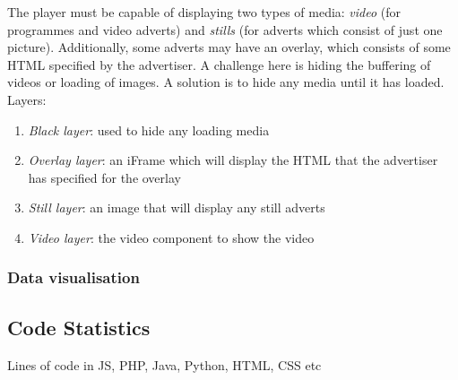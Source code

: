 The player must be capable of displaying two types of media: \textit{video} (for programmes and video adverts) and \textit{stills} (for adverts which consist of just one picture). Additionally, some adverts may have an overlay, which consists of some HTML specified by the advertiser. A challenge here is hiding the buffering of videos or loading of images. A solution is to hide any media until it has loaded. Layers:
\begin{enumerate}
\item \textit{Black layer}: used to hide any loading media
\item \textit{Overlay layer}: an iFrame which will display the HTML that the advertiser has specified for the overlay
\item \textit{Still layer}: an image that will display any still adverts
\item \textit{Video layer}: the video component to show the video
\end{enumerate}

\subsubsection{Data visualisation}


\subsection{Code Statistics}
Lines of code in JS, PHP, Java, Python, HTML, CSS etc


